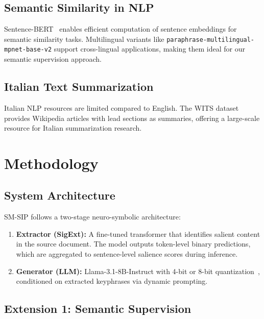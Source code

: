 \documentclass[conference]{IEEEtran}
\begin{document}
\subsection{Semantic Similarity in NLP}
Sentence-BERT~\cite{reimers2019sbert} enables efficient computation of sentence embeddings for semantic similarity tasks. Multilingual variants like \texttt{paraphrase-multilingual-mpnet-base-v2} support cross-lingual applications, making them ideal for our semantic supervision approach.

\subsection{Italian Text Summarization}
Italian NLP resources are limited compared to English. The WITS dataset~\cite{casola2021wits} provides Wikipedia articles with lead sections as summaries, offering a large-scale resource for Italian summarization research.

\section{Methodology}

\subsection{System Architecture}

SM-SIP follows a two-stage neuro-symbolic architecture:

\begin{enumerate}
    \item \textbf{Extractor (SigExt):} A fine-tuned transformer that identifies salient content in the source document. The model outputs token-level binary predictions, which are aggregated to sentence-level salience scores during inference.
    \item \textbf{Generator (LLM):} Llama-3.1-8B-Instruct with 4-bit or 8-bit quantization~\cite{dettmers2022llm}, conditioned on extracted keyphrases via dynamic prompting.
\end{enumerate}

\subsection{Extension 1: Semantic Supervision}
\label{sec:semantic}
\end{document}
